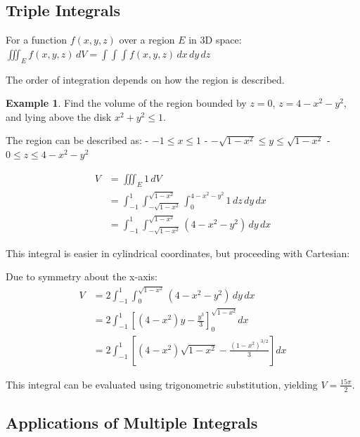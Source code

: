 \documentclass[12pt,a4paper]{book}
\theoremstyle{definition}
\newtheorem{example}{Example}[chapter]
\begin{document}
\subsection{Triple Integrals}

\begin{keyformula}
For a function $f(x,y,z)$ over a region $E$ in 3D space:
$\iiint_E f(x,y,z) \, dV = \int \int \int f(x,y,z) \, dx \, dy \, dz$

The order of integration depends on how the region is described.
\end{keyformula}

\begin{example}
Find the volume of the region bounded by $z = 0$, $z = 4-x^2-y^2$, and lying above the disk $x^2 + y^2 \leq 1$.

The region can be described as:
- $-1 \leq x \leq 1$
- $-\sqrt{1-x^2} \leq y \leq \sqrt{1-x^2}$
- $0 \leq z \leq 4-x^2-y^2$

\begin{align}
V &= \iiint_E 1 \, dV\\
&= \int_{-1}^1 \int_{-\sqrt{1-x^2}}^{\sqrt{1-x^2}} \int_0^{4-x^2-y^2} 1 \, dz \, dy \, dx\\
&= \int_{-1}^1 \int_{-\sqrt{1-x^2}}^{\sqrt{1-x^2}} (4-x^2-y^2) \, dy \, dx
\end{align}

This integral is easier in cylindrical coordinates, but proceeding with Cartesian:

Due to symmetry about the x-axis:
\begin{align}
V &= 2\int_{-1}^1 \int_0^{\sqrt{1-x^2}} (4-x^2-y^2) \, dy \, dx\\
&= 2\int_{-1}^1 \left[ (4-x^2)y - \frac{y^3}{3} \right]_0^{\sqrt{1-x^2}} dx\\
&= 2\int_{-1}^1 \left[ (4-x^2)\sqrt{1-x^2} - \frac{(1-x^2)^{3/2}}{3} \right] dx
\end{align}

This integral can be evaluated using trigonometric substitution, yielding $V = \frac{15\pi}{2}$.
\end{example}

\subsection{Applications of Multiple Integrals}
\end{document}
